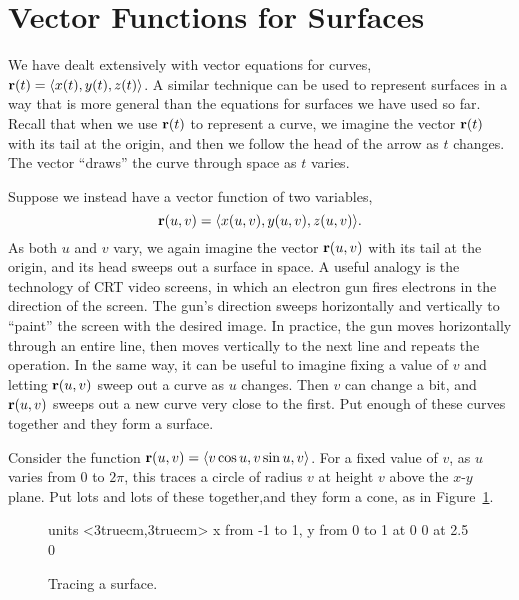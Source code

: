 \section{Vector Functions for Surfaces}\label{sec:VectorFunctionSurfaces}

We have dealt extensively with vector equations for curves, 
${\bf r}(t)=\langle x(t),y(t),z(t)\rangle$. A similar technique
can be used to represent surfaces in a way that is more general than
the equations for surfaces we have used so far. Recall that
when we use ${\bf r}(t)$ to represent a curve, we imagine the vector 
${\bf r}(t)$ with its tail at the origin, and then we follow the head
of the arrow as $t$ changes. The vector ``draws'' the curve through
space as $t$ varies.

Suppose we instead have a vector function of two variables,
$${\bf r}(u,v)=\langle x(u,v),y(u,v),z(u,v)\rangle.$$
As both $u$ and
$v$ vary, we again imagine the vector ${\bf r}(u,v)$ with its tail at
the origin, and its head sweeps out a surface in space. A useful
analogy is the technology of CRT video screens, in which an electron
gun fires electrons in the direction of the screen. The gun's
direction sweeps horizontally and vertically to ``paint'' the screen
with the desired image. In practice, the gun moves horizontally
through an entire line, then moves vertically to the next line and
repeats the operation. In the same way, it can be useful to imagine
fixing a value of $v$ and letting ${\bf r}(u,v)$ sweep out a curve as
$u$ changes. Then $v$ can change a bit, and ${\bf r}(u,v)$ sweeps out
a new curve very close to the first. Put enough of these curves
together and they form a surface.

\begin{example}{}{}
Consider the function ${\bf r}(u,v)=\langle v\cos u,v\sin u,
v\rangle$. For a fixed value of $v$, as $u$ varies from 0 to $2\pi$,
this traces a circle of radius $v$ at height $v$ above the
$x$-$y$ plane. Put lots and lots of these together,and they form a
cone, as in Figure~\ref{fig:parametric cone}.
\end{example}

\begin{figure}[H]
\centerline{
\vbox{\beginpicture
\normalgraphs
\setcoordinatesystem units <3truecm,3truecm>
\setplotarea x from -1 to 1, y from 0 to 1
 at 0 0
 at 2.5 0
\endpicture}}
\caption{Tracing a surface. \label{fig:parametric cone}}
\end{figure}

